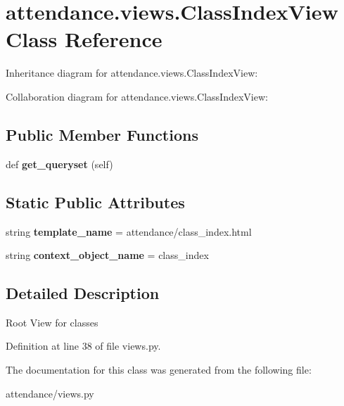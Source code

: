 \hypertarget{classattendance_1_1views_1_1_class_index_view}{}\section{attendance.\+views.\+Class\+Index\+View Class Reference}
\label{classattendance_1_1views_1_1_class_index_view}


Inheritance diagram for attendance.\+views.\+Class\+Index\+View\+:


Collaboration diagram for attendance.\+views.\+Class\+Index\+View\+:
\subsection*{Public Member Functions}
\begin{DoxyCompactItemize}
\item 
\hypertarget{classattendance_1_1views_1_1_class_index_view_a7b7081ba8c3d6fed0c1ae5c368d43e76}{}\label{classattendance_1_1views_1_1_class_index_view_a7b7081ba8c3d6fed0c1ae5c368d43e76} 
def {\bfseries get\+\_\+queryset} (self)
\end{DoxyCompactItemize}
\subsection*{Static Public Attributes}
\begin{DoxyCompactItemize}
\item 
\hypertarget{classattendance_1_1views_1_1_class_index_view_a130954fb033882b06feca0e92ad0f84e}{}\label{classattendance_1_1views_1_1_class_index_view_a130954fb033882b06feca0e92ad0f84e} 
string {\bfseries template\+\_\+name} = \textquotesingle{}attendance/class\+\_\+index.\+html\textquotesingle{}
\item 
\hypertarget{classattendance_1_1views_1_1_class_index_view_a6d48aba50a941d1873e8b0522785db21}{}\label{classattendance_1_1views_1_1_class_index_view_a6d48aba50a941d1873e8b0522785db21} 
string {\bfseries context\+\_\+object\+\_\+name} = \textquotesingle{}class\+\_\+index\textquotesingle{}
\end{DoxyCompactItemize}


\subsection{Detailed Description}
\begin{DoxyVerb}Root View for classes
\end{DoxyVerb}
 

Definition at line 38 of file views.\+py.



The documentation for this class was generated from the following file\+:\begin{DoxyCompactItemize}
\item 
attendance/views.\+py\end{DoxyCompactItemize}
